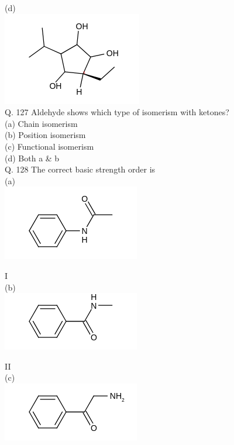 \documentclass[10pt]{article}
\begin{document}
(d)\\
\includegraphics{smile-dc6516ed7f79a9aac817ddfc2b18e49f6a69125d}\\
Q. 127 Aldehyde shows which type of isomerism with ketones?\\
(a) Chain isomerism\\
(b) Position isomerism\\
(c) Functional isomerism\\
(d) Both a \& b\\
Q. 128 The correct basic strength order is\\
(a)\\
\includegraphics{smile-21cfd783a159a0c7d328e798ea6cffc03a20467a}

I\\
(b)\\
\includegraphics{smile-c8b065917fd43e753231841b17c1cf4b39f9a84a}

II\\
(c)\\
\includegraphics{smile-a2ef4b143e164efac1a0b56f0f26943074c9e624}
\end{document}
